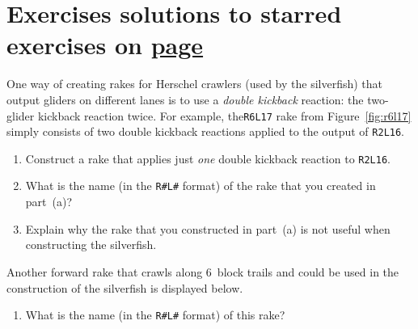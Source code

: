 \section*{Exercises \hfill \normalfont\textsf{\small solutions to starred exercises on \hyperlink{solutions_self_support_spaceships}{page \pageref{solutions_self_support_spaceships}}}}
\label{sec:solutions_self_support_spaceships}
\vspace*{-0.4cm}\hrulefill\vspace*{-0.3cm}\footnotesize\begin{multicols}{2}\vspace*{-0.4cm}\raggedcolumns{}
\setlength{\parskip}{0pt}


\begin{problemstar}\label{exer:self_support_spaceships_r4l1}
	One way of creating rakes for Herschel crawlers (used by the silverfish) that output gliders on different lanes is to use a \emph{double kickback} reaction: the two-glider kickback reaction twice. For example, the\texttt{R6L17} rake from Figure~\ref{fig:r6l17} simply consists of two double kickback reactions applied to the output of \texttt{R2L16}.
	
	\begin{enumerate}[label=\bf\color{ocre}(\alph*)]
		\item Construct a rake that applies just \emph{one} double kickback reaction to \texttt{R2L16}.
		
		\item What is the name (in the \texttt{R\#L\#} format) of the rake that you created in part~(a)?
		
		\item Explain why the rake that you constructed in part~(a) is not useful when constructing the silverfish.
	\end{enumerate}
\end{problemstar}


\mfilbreak


\begin{problem}\label{exer:self_support_spaceships_r6l21}
	Another forward rake that crawls along $6$~block trails and could be used in the construction of the silverfish is displayed below.
	\begin{center}
	\end{center}
	
	\begin{enumerate}[label=\bf\color{ocre}(\alph*)]
		\item What is the name (in the \texttt{R\#L\#} format) of this rake?
		

\end{enumerate}
\end{problem}
\end{multicols}
